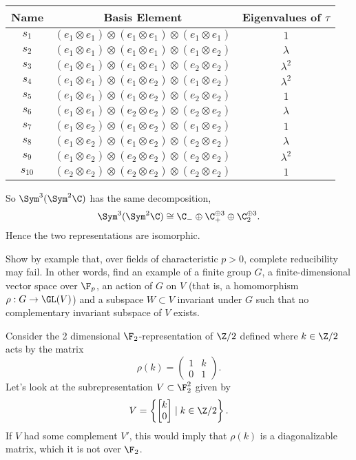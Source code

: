 \documentclass[11pt,letterpaper]{article}
\begin{document}
\begin{center}
\begin{tabular}{ |c|c|c| } 
     \hline
     \textbf{Name}& \textbf{Basis Element} & \textbf{Eigenvalues of $\tau$} \\ 
     \hline
     $s_1$&$(e_1\otimes e_1)\otimes (e_1\otimes e_1)\otimes (e_1\otimes e_1)$ & $1$ \\ 
     $s_2$&$(e_1\otimes e_1)\otimes (e_1\otimes e_1)\otimes (e_1\otimes e_2)$ & $\lambda$ \\ 
     $s_3$&$(e_1\otimes e_1)\otimes (e_1\otimes e_1)\otimes (e_2\otimes e_2)$ & $\lambda^2$ \\ 
     $s_4$&$(e_1\otimes e_1)\otimes (e_1\otimes e_2)\otimes (e_1\otimes e_2)$ & $\lambda^2$ \\ 
     $s_5$&$(e_1\otimes e_1)\otimes (e_1\otimes e_2)\otimes (e_2\otimes e_2)$ & $1$ \\ 
     $s_6$&$(e_1\otimes e_1)\otimes (e_2\otimes e_2)\otimes (e_2\otimes e_2)$ & $\lambda$ \\ 
     $s_7$&$(e_1\otimes e_2)\otimes (e_1\otimes e_2)\otimes (e_1\otimes e_2)$ & $1$ \\ 
     $s_8$&$(e_1\otimes e_2)\otimes (e_1\otimes e_2)\otimes (e_2\otimes e_2)$ & $\lambda$ \\ 
     $s_9$&$(e_1\otimes e_2)\otimes (e_2\otimes e_2)\otimes (e_2\otimes e_2)$ & $\lambda^2$ \\ 
     $s_{10}$&$(e_2\otimes e_2)\otimes (e_2\otimes e_2)\otimes (e_2\otimes e_2)$ & $1$ \\ 
 \hline
\end{tabular}
\end{center}

So $\Sym^3(\Sym^2\C)$ has the same decomposition,
\[
    \Sym^3(\Sym^2\C) \cong \C_-\oplus\C_+^{\oplus 3}\oplus \C_2^{\oplus 3}
.\] 
Hence the two representations are isomorphic.

\pagebreak
\begin{problem}
    Show by example that, over fields of characteristic $p > 0$, complete reducibility may fail. In other words, find an example of a finite group $G$, a finite-dimensional vector space over $\F_p$, an action of $G$ on $V$ (that is, a homomorphism $\rho : G \to \GL(V)$) and a subspace $W \subset V$ invariant under $G$ such that no complementary invariant subspace of $V$ exists.
\end{problem}

Consider the 2 dimensional $\F_2$-representation of $\Z/2$ defined where $k\in \Z/2$ acts by the matrix
\[
    \rho(k) = \begin{pmatrix}1&k\\0&1\end{pmatrix}
.\] 
Let's look at the subrepresentation $V\subset \F_2^2$ given by
\[
    V = \left\{ \begin{bmatrix}k\\0\end{bmatrix}\mid k\in \Z/2\right\}
.\]
If $V$ had some complement $V'$, this would imply that $\rho(k)$ is a diagonalizable matrix, which it is not over $\F_2$.
\end{document}
